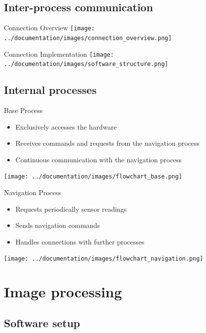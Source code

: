 \documentclass{beamer}
\begin{document}
\subsection{Inter-process communication}

\begin{frame}{Connection Overview}
\centering
\texttt{[image: ../documentation/images/connection\_overview.png]}
\end{frame}

\begin{frame}{Connection Implementation}
\centering
\texttt{[image: ../documentation/images/software\_structure.png]}
\end{frame}

\subsection{Internal processes}

\begin{frame}{Base Process}
\begin{itemize}
\item Exclusively accesses the hardware
\item Receives commands and requests from the navigation process
\item Continuous communication with the navigation process
\end{itemize}
\pause
\centering
\texttt{[image: ../documentation/images/flowchart\_base.png]}
\end{frame}

\begin{frame}{Navigation Process}
\begin{itemize}
\item Requests periodically sensor readings
\item Sends navigation commands
\item Handles connections with further processes
\end{itemize}
\pause
\centering
\texttt{[image: ../documentation/images/flowchart\_navigation.png]}
\end{frame}

\section{Image processing}

\subsection{Software setup}
\end{document}

